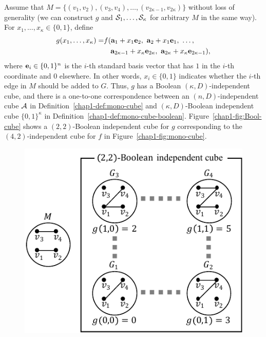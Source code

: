 {%
Assume that 
$M = \{(v_1, v_2), (v_3, v_4), \ldots, (v_{2\kappa-1}, v_{2\kappa})\}$ without loss of generality 
(we can construct $g$ and $\mathcal{S}_1, \ldots, \mathcal{S}_\kappa$ for arbitrary $M$ in the same way). 
For $x_1, \ldots, x_\kappa \in \{0,1\}$, 
define
\begin{align*}
  g(x_1, \ldots, x_\kappa) = & f(\mathbf{a}_1 + x_1 \mathbf{e}_2,~ \mathbf{a}_2 + x_1 \mathbf{e}_1,~ \ldots,  \\
  &\hspace{3.3mm}\mathbf{a}_{2\kappa-1} + x_\kappa \mathbf{e}_{2\kappa},~ \mathbf{a}_{2\kappa} + x_\kappa \mathbf{e}_{2\kappa-1}),
\end{align*}
where $\mathbf{e}_i \in \{0,1\}^n$ is the $i$-th standard basis vector that has $1$ in the $i$-th coordinate and $0$ elsewhere. 
In other words, 
$x_i \in \{0,1\}$ indicates whether the $i$-th edge in $M$ should be
added to 
$G$. 
Thus, $g$ has a Boolean $(\kappa,D)$-independent cube, and 
there is a one-to-one correspondence between an $(n,D)$-independent cube $\mathcal{A}$ in Definition~\ref{chap1-def:mono-cube} 
and 
$(\kappa,D)$-Boolean independent cube $\{0,1\}^\kappa$ in Definition~\ref{chap1-def:mono-cube-boolean}. 
Figure~\ref{chap1-fig:Bool-cube} shows a $(2,2)$-Boolean independent cube for $g$ corresponding to the $(4,2)$-independent cube for $f$ in Figure~\ref{chap1-fig:mono-cube}.

\begin{figure}[t]
  \centering
  \includegraphics[width=0.88\linewidth]{fig/BoolCube.pdf}
  

\end{figure}}
